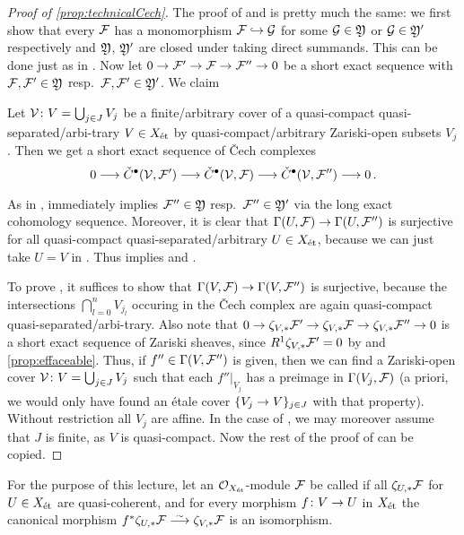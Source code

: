 \begin{proof}[Proof of \cref{prop:technicalCech}]
	The proof of  and  is pretty much the same: we first show that every $\mathcal{F}$ has a monomorphism $\Ff\monomorphism \Gg$ for some $\mathcal{G}\in \mathfrak{Y}$ or $\mathcal{G}\in \mathfrak{Y}'$ respectively and $\mathfrak{Y}$, $\mathfrak{Y}'$ are closed under taking direct summands. This can be done just as in . Now let $0\morphism \Ff'\morphism \Ff\morphism \Ff''\morphism 0$ be a short exact sequence with $\mathcal{F},\mathcal{F}'\in \mathfrak{Y}$ resp.\ $\mathcal{F},\mathcal{F}'\in \mathfrak{Y}'$. We claim
	\begin{alphanumerate}
		\item[\itememph{*'}] Let $\mathcal{V}\colon V=\bigcup_{j\in J}V_j$ be a finite/arbitrary cover of a quasi-compact quasi-separated/arbi-trary $V\in X_{\mathrm{\acute{e}t}}$ by quasi-compact/arbitrary Zariski-open subsets $V_j$. Then we get a short exact sequence of \v Cech complexes
		\begin{equation*}
		0\morphism \check{C}^\bullet(\Vv,\Ff')\morphism \check{C}^\bullet(\Vv,\Ff)\morphism \check{C}^\bullet(\Vv,\Ff'')\morphism 0\,.
		\end{equation*}
	\end{alphanumerate}
	As in ,  immediately implies $\mathcal{F}''\in \mathfrak{Y}$ resp.\ $\mathcal{F}''\in \mathfrak{Y}'$ via the long exact cohomology sequence. Moreover, it is clear that $\Global(U,\Ff)\morphism \Global(U,\Ff'')$ is surjective for all quasi-compact quasi-separated/arbitrary $U\in X_{\mathrm{\acute{e}t}}$, because we can just take $U=V$ in . Thus  implies  and .
	
	To prove , it suffices to show that $\Global(V,\Ff)\morphism \Global(V,\Ff'')$ is surjective, because the intersections $\bigcap_{l=0}^nV_{j_l}$ occuring in the \v Cech complex are again quasi-compact quasi-separated/arbi-trary. Also note that $0\morphism \zeta_{V,*}\Ff'\morphism \zeta_{V,*}\Ff\morphism \zeta_{V,*}\Ff''\morphism 0$ is a short exact sequence of Zariski sheaves, since $R^1\zeta_{V,*}\mathcal{F}'=0$ by  and \cref{prop:effaceable}. Thus, if $f''\in \operatorname{\Gamma}(V,\mathcal{F}'')$ is given, then we can find a Zariski-open cover $\mathcal{V}\colon V=\bigcup_{j\in J}V_j$ such that each $f''|_{V_j}$ has a preimage in $\operatorname{\Gamma}(V_j,\mathcal{F})$ (a priori, we would only have found an étale cover $\{V_j\morphism V\}_{j\in J}$ with that property). Without restriction all $V_j$ are affine. In the case of , we may moreover assume that $J$ is finite, as $V$ is quasi-compact. Now the rest of the proof of  can be copied.
\end{proof}
\begin{defi}
	For the purpose of this lecture, let an $\mathcal{O}_{X_{\mathrm{\acute{e}t}}}$-module $\mathcal{F}$ be called  if all $\zeta_{U,*}\mathcal{F}$ for $U\in X_{\mathrm{\acute{e}t}}$ are quasi-coherent, and for every morphism $f\colon V\morphism U$ in $X_{\mathrm{\acute{e}t}}$ the canonical morphism $f^*\zeta_{U,*}\Ff\isomorphism \zeta_{V,*}\Ff$ is an isomorphism.%
\end{defi}
